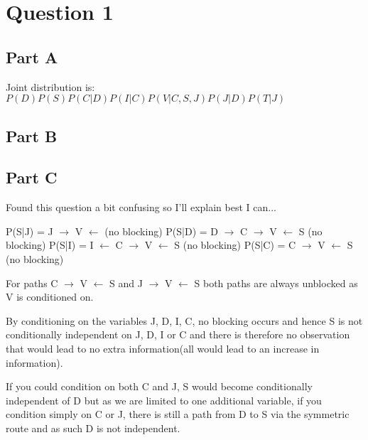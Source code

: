 \documentclass[11pt]{report}
\begin{document}
\section{Question 1}
\subsection{Part A}
Joint distribution is: $P(D)P(S)P(C|D)P(I|C)P(V|C,S,J)P(J|D)P(T|J)$

\subsection{Part B}

\subsection{Part C}
Found this question a bit confusing so I'll explain best I can...

P(S|J) = J $\rightarrow$ V $\leftarrow$ (no blocking)
P(S|D) = D $\rightarrow$ C $\rightarrow$ V $\leftarrow$ S (no blocking)
P(S|I) = I $\leftarrow$ C $\rightarrow$ V $\leftarrow$ S (no blocking)
P(S|C) = C $\rightarrow$ V $\leftarrow$ S (no blocking)

For paths C $\rightarrow$ V $\leftarrow$ S and J $\rightarrow$ V $\leftarrow$ S both paths are always unblocked as V is conditioned on.

By conditioning on the variables J, D, I, C, no blocking occurs and hence S is not conditionally independent on J, D, I or C and there is therefore no observation that would lead to no extra information(all would lead to an increase in information).

If you could condition on both C and J, S would become conditionally independent of D but as we are limited to one additional variable, if you condition simply on C or J, there is still a path from D to S via the symmetric route and as such D is not independent. 
\end{document}
